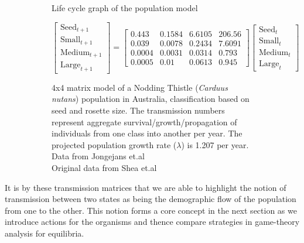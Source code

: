 \begin{figure}[h]
\begin{subfigure}[b]{.5\linewidth}
        \caption{Life cycle graph of the population model}\label{fig:1a}
    \end{subfigure}
    \begin{subfigure}[b]{.5\linewidth}
        \centering
        \footnotesize
        $$ \begin{bmatrix}\text{Seed}_{t+1}\\\text{Small}_{t+1}\\\text{Medium}_{t+1}\\\text{Large}_{t+1}\end{bmatrix}= 
        \begin{bmatrix}
            0.443&0.1584&6.6105&206.56\\
            0.039&0.0078&0.2434&7.6091\\
            0.0004&0.0031&0.0314&0.793\\
            0.0005&0.01&0.0613&0.945
        \end{bmatrix}
        \begin{bmatrix}\text{Seed}_{t}\\\text{Small}_{t}\\\text{Medium}_{t}\\\text{Large}_{t}\end{bmatrix}$$
        \caption{
            4x4 matrix model of a Nodding Thistle (\textit{Carduus nutans}) population in Australia, classification based on seed and rosette size. The transmission numbers represent aggregate survival/growth/propagation of individuals from one class into another per year. The projected population growth rate ($\lambda$) is 1.207 per year.\\
      Data from Jongejans et.al\cite{models2}\\ Original data from Shea et.al\cite{models3}
        }\label{fig:1b}
    \end{subfigure}
        \vspace{-2.3\baselineskip}
    \caption{}\label{fig:1}
\end{figure}

It is by these transmission matrices that we are able to highlight the notion of transmission between two states as being the demographic flow of the population from one to the other.
This notion forms a core concept in the next section as we introduce actions for the organisms and thence compare strategies in game-theory analysis for equilibria.

